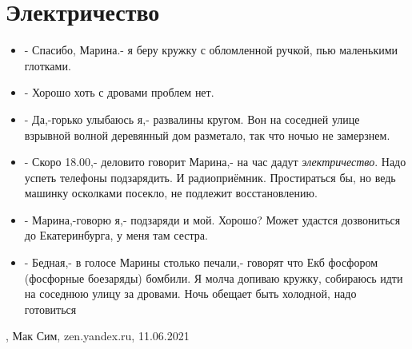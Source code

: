  
 
 
 
 
\chapter{Электричество}

\begin{itemize}
\item - Спасибо, Марина.- я беру кружку с обломленной ручкой, пью маленькими глотками.
\item - Хорошо хоть с дровами проблем нет.
\item - Да,-горько улыбаюсь я,- развалины кругом. Вон на соседней улице взрывной волной деревянный дом разметало, так что ночью не замерзнем.
\item - Скоро 18.00,- деловито говорит Марина,- на час дадут \emph{электричество}. Надо успеть телефоны подзарядить. И радиоприёмник. Простираться бы, но ведь машинку осколками посекло, не подлежит восстановлению.
\item - Марина,-говорю я,- подзаряди и мой. Хорошо? Может удастся дозвониться до Екатеринбурга, у меня там сестра.
\item - Бедная,- в голосе Марины столько печали,- говорят что Екб фосфором (фосфорные боезаряды) бомбили.
Я молча допиваю кружку, собираюсь идти на соседнюю улицу за дровами. Ночь обещает быть холодной, надо готовиться
\end{itemize}
, Мак Сим, zen.yandex.ru, 11.06.2021


